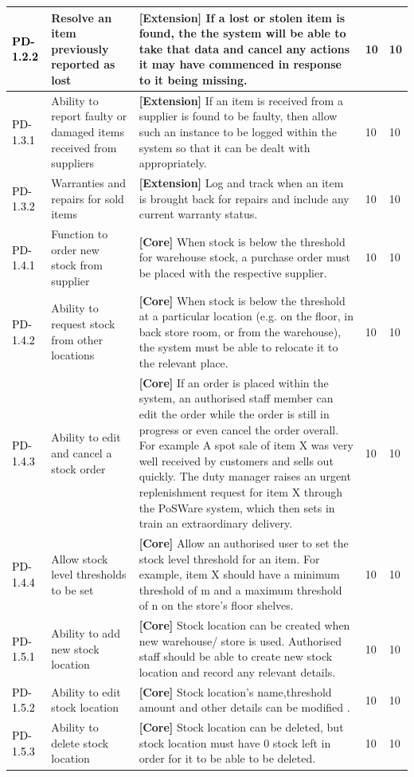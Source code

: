 \documentclass[a4paper]{article}
\begin{document}
\begin{longtable}{|l|p{5cm}|p{7cm}|p{0.5cm}|p{0.5cm}|}
\textcolor{black}{PD-1.2.2} & Resolve an item previously reported as lost & \textbf{[Extension] }If a lost or stolen item is found, the the system will be able to take that data and cancel any actions it may have commenced in response to it being missing.& 10 & 10\\
\hline
\textcolor{black}{PD-1.3.1} & Ability to report faulty or damaged items received from suppliers & \textbf{[Extension] }If an item is received from a supplier is found to be faulty, then allow such an instance to be logged within the system so that it can be dealt with appropriately.& 10 & 10\\
\textcolor{black}{PD-1.3.2} & Warranties and repairs for sold items & \textbf{[Extension] }Log and track when an item is brought back for repairs and include any current warranty status.& 10 & 10\\
\hline
\textcolor{black}{PD-1.4.1} & Function to order new stock from supplier & \textbf{[Core] }When stock is below the threshold for warehouse stock, a purchase order must be placed with the respective supplier.& 10 & 10\\
\textcolor{black}{PD-1.4.2} & Ability to request stock from other locations & \textbf{[Core] }When stock is below the threshold at a particular location (e.g. on the floor, in back store room, or from the warehouse), the system must be able to relocate it to the relevant place.& 10 & 10\\
\textcolor{black}{PD-1.4.3} & Ability to edit and cancel a stock order & \textbf{[Core] }If an order is placed within the system, an authorised staff member can edit the order while the order is still in progress or even cancel the order overall. For example A spot sale of item X was very well received by customers and sells out quickly. The duty manager raises an urgent replenishment request for item X through the PoSWare system, which then sets in train an extraordinary delivery.& 10 & 10\\
\textcolor{black}{PD-1.4.4} & Allow stock level thresholds to be set & \textbf{[Core] }Allow an authorised user to set the stock level threshold for an item. For example, item X should have a minimum threshold of m and a maximum threshold of n on the store's floor shelves.& 10 & 10\\
\hline
\textcolor{black}{PD-1.5.1} & Ability to add new stock location & \textbf{[Core] }Stock location can be created when new warehouse/ store is used. Authorised staff should be able to create new stock location and record any relevant details.& 10 & 10\\
\textcolor{black}{PD-1.5.2} & Ability to edit stock location & \textbf{[Core] }Stock location's name,threshold amount and other details can be modified .& 10 & 10\\
\textcolor{black}{PD-1.5.3} & Ability to delete stock location & \textbf{[Core] }Stock location can be deleted, but stock location must have 0 stock left in order for it to be able to be deleted.& 10 & 10\\


\end{longtable}
\end{document}
